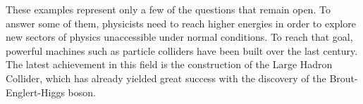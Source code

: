     These examples represent only a few of the questions that remain open. To answer some of them, physicists need to reach higher energies in order to explore new sectors of physics unaccessible under normal conditions. To reach that goal, powerful machines such as particle colliders have been built over the last century. The latest achievement in this field is the construction of the Large Hadron Collider, which has already yielded great success with the discovery of the Brout-Englert-Higgs boson.

